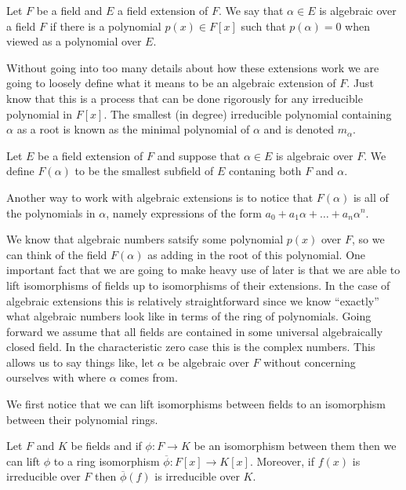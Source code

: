 \begin{defn}
  Let $F$ be a field and $E$ a field extension of $F$.
  We say that $\alpha \in E$ is algebraic over a field $F$ if there is a 
  polynomial $p(x) \in F[x]$ such that $p(\alpha) = 0$ when viewed as
  a polynomial over $E$.
\end{defn}

Without going into too many details about how these extensions work we are
going to loosely define what it means to be an algebraic extension of $F$. Just
know that this is a process that can be done rigorously for any irreducible
polynomial in $F[x]$. The smallest (in degree) irreducible polynomial
containing $\alpha$ as a root is known as the minimal polynomial of $\alpha$
and is denoted $m_{\alpha}$.

\begin{defn}
  Let $E$ be a field extension of $F$ and suppose that $\alpha \in E$ is
  algebraic over $F$. We define $F(\alpha)$ to be the smallest subfield of $E$ 
  contaning both $F$ and $\alpha$. 
\end{defn}

Another way to work with algebraic extensions is to notice that $F(\alpha)$ is
all of the polynomials in $\alpha$, namely expressions of the form $a_0
+ a_1\alpha + \ldots + a_{n}\alpha^{n}$.

We know that algebraic numbers satsify some polynomial $p(x)$ over $F$, 
so we can think of the field $F(\alpha)$ as adding in the root of this
polynomial. One important fact that we are going to make heavy use of later is
that we are able to lift isomorphisms of fields up to isomorphisms of their
extensions. In the case of algebraic extensions this is relatively
straightforward since we know ``exactly'' what algebraic numbers look like in
terms of the ring of polynomials. Going forward we assume that all fields are
contained in some universal algebraically closed field. In the characteristic
zero case this is the complex numbers. This allows us to say things like, let
$\alpha$ be algebraic over $F$ without concerning ourselves with where $\alpha$
comes from.

We first notice that we can lift isomorphisms between fields to an isomorphism
between their polynomial rings.

\begin{lemma}\label{lemma:extendtoring}
  Let $F$ and $K$ be fields and if $\phi: F \to K$ be an isomorphism between
  them then we can lift $\phi$ to a ring isomorphism $\overline{\phi}: F[x] \to
  K[x]$. Moreover, if $f(x)$ is irreducible over $F$ then $\overline{\phi}(f)$ 
  is irreducible over $K$.
\end{lemma}

